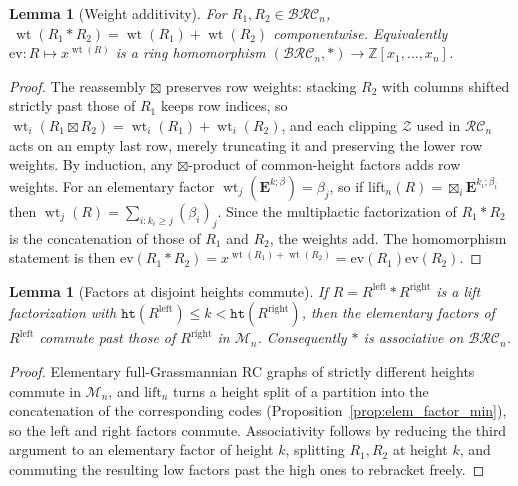 \documentclass{amsart}
\newtheorem{lemma}[theorem]{Lemma}
\theoremstyle{definition}
\theoremstyle{remark}
\newcommand{\BRC}{\mathcal{BRC}}
\newcommand{\RC}{\mathcal{RC}}
\newcommand{\Mn}{\mathcal{M}}
\newcommand{\wtt}{\operatorname{wt}}
\newcommand{\hr}{\mathtt{ht}}
\newcommand{\zeromap}{\mathcal{Z}}
\begin{document}
\begin{lemma}[Weight additivity]\label{lemma:liftweight}
For $R_1,R_2\in\BRC_n$, $\ \wtt(R_1*R_2)=\wtt(R_1)+\wtt(R_2)$ componentwise. Equivalently $\mathrm{ev}:R\mapsto x^{\wtt(R)}$ is a ring homomorphism $(\BRC_n,*)\to\mathbb{Z}[x_1,\ldots,x_n]$.
\end{lemma}
\begin{proof}
The reassembly $\boxtimes$ preserves row weights: stacking $R_2$ with columns shifted strictly past those of $R_1$ keeps row indices, so $\wtt_i(R_1\boxtimes R_2)=\wtt_i(R_1)+\wtt_i(R_2)$, and each clipping $\zeromap$ used in $\RC_n$ acts on an empty last row, merely truncating it and preserving the lower row weights. By induction, any $\boxtimes$-product of common-height factors adds row weights. For an elementary factor $\wtt_j(\mathbf{E}^{k;\beta})=\beta_j$, so if $\mathrm{lift}_n(R)=\boxtimes_i\mathbf{E}^{k_i;\beta_i}$ then $\wtt_j(R)=\sum_{i:k_i\geq j}(\beta_i)_j$. Since the multiplactic factorization of $R_1*R_2$ is the concatenation of those of $R_1$ and $R_2$, the weights add. The homomorphism statement is then $\mathrm{ev}(R_1*R_2)=x^{\wtt(R_1)+\wtt(R_2)}=\mathrm{ev}(R_1)\mathrm{ev}(R_2)$.
\end{proof}

\begin{lemma}[Factors at disjoint heights commute]\label{lemma:liftcommute}
If $R=R^{\mathrm{left}}*R^{\mathrm{right}}$ is a lift factorization with $\hr(R^{\mathrm{left}})\leq k<\hr(R^{\mathrm{right}})$, then the elementary factors of $R^{\mathrm{left}}$ commute past those of $R^{\mathrm{right}}$ in $\Mn_n$. Consequently $*$ is associative on $\BRC_n$.
\end{lemma}
\begin{proof}
Elementary full-Grassmannian RC graphs of strictly different heights commute in $\Mn_n$, and $\mathrm{lift}_n$ turns a height split of a partition into the concatenation of the corresponding codes (Proposition~\ref{prop:elem_factor_min}), so the left and right factors commute. Associativity follows by reducing the third argument to an elementary factor of height $k$, splitting $R_1,R_2$ at height $k$, and commuting the resulting low factors past the high ones to rebracket freely.
\end{proof}
\end{document}
